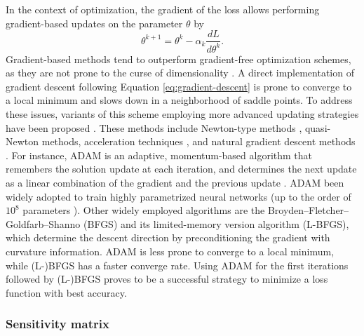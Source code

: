 In the context of optimization, the gradient of the loss allows performing gradient-based updates on the parameter $\theta$ by 
\begin{equation}\label{eq:gradient-descent}
    \theta^{k+1} 
    = 
    \theta^k 
    - 
    \alpha_k 
    \frac{dL}{d\theta^k}.
\end{equation}
Gradient-based methods tend to outperform gradient-free optimization schemes, as they are not prone to the curse of dimensionality \cite{Schartau2017}. 
A direct implementation of gradient descent following Equation \eqref{eq:gradient-descent} is prone to converge to a local minimum and slows down in a neighborhood of saddle points. 
To address these issues, variants of this scheme employing more advanced updating strategies have been proposed \cite{ruder2016overview-gradient-descent}.
These methods include Newton-type methods \cite{second-order-optimization}, quasi-Newton methods, acceleration techniques \cite{JMLR:v22:20-207}, and natural gradient descent methods \cite{doi:10.1137/22M1477805}. 
For instance, ADAM is an adaptive, momentum-based algorithm  that remembers the solution update at each iteration, and determines the next update as a linear combination of the gradient and the previous update \cite{Kingma2014}.
ADAM been widely adopted to train highly parametrized neural networks (up to the order of $10^8$ parameters \cite{NIPS2017_3f5ee243}).
Other widely employed algorithms are the Broyden–Fletcher–Goldfarb–Shanno (BFGS) and its limited-memory version algorithm (L-BFGS), which determine the descent direction by preconditioning the gradient with curvature information. 
ADAM is less prone to converge to a local minimum, while (L-)BFGS has a faster converge rate. 
Using ADAM for the first iterations followed by (L-)BFGS proves to be a successful strategy to minimize a loss function with best accuracy. 

% 

\subsubsection{Sensitivity matrix}

